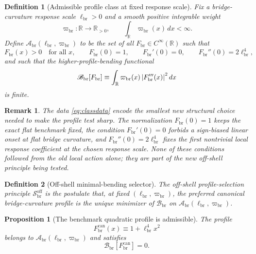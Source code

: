 \documentclass[11pt]{article}
\newcommand{\CurvScale}{\ell_{\mathrm{br}}}
\newcommand{\CurvProfile}{F_{\mathrm{br}}}
\newcommand{\CurvProfileCan}{F_{\mathrm{br}}^{\mathrm{can}}}
\newcommand{\ProfWeight}{\varpi_{\mathrm{br}}}
\newcommand{\ProfClass}{\mathscr A_{\mathrm{br}}}
\newcommand{\ProfBend}{\mathscr B_{\mathrm{br}}}
\newcommand{\ProfRule}{\mathscr S_{\mathrm{br}}^{\mathrm{off}}}
\newtheorem{definition}{Definition}
\newtheorem{proposition}{Proposition}
\newtheorem{remark}{Remark}
\begin{document}
\begin{definition}[Admissible profile class at fixed response scale]
\label{def:class}
Fix a bridge-curvature response scale \(\CurvScale>0\) and a smooth positive integrable weight
\begin{equation}
\ProfWeight:\mathbb R\to\mathbb R_{>0},
\qquad
\int_{\mathbb R}\ProfWeight(x)\,dx<\infty.
\label{eq:weight}
\end{equation}
Define \(\ProfClass(\CurvScale,\ProfWeight)\) to be the set of all \(\CurvProfile\in C^\infty(\mathbb R)\) such that
\begin{equation}
\CurvProfile(x)>0\quad\text{for all }x,
\qquad
\CurvProfile(0)=1,
\qquad
\CurvProfile'(0)=0,
\qquad
\CurvProfile''(0)=2\CurvScale^4,
\label{eq:classdata}
\end{equation}
and such that the higher-profile-bending functional
\begin{equation}
\ProfBend[\CurvProfile]
\equiv
\int_{\mathbb R}\ProfWeight(x)\,\abs{\CurvProfile'''(x)}^2\,dx
\label{eq:bending}
\end{equation}
is finite.
\end{definition}

\begin{remark}
The data \eqref{eq:classdata} encode the smallest new structural choice needed to make the profile test sharp. The normalization \(\CurvProfile(0)=1\) keeps the exact flat benchmark fixed, the condition \(\CurvProfile'(0)=0\) forbids a sign-biased linear onset at flat bridge curvature, and \(\CurvProfile''(0)=2\CurvScale^4\) fixes the first nontrivial local response coefficient at the chosen response scale. None of these conditions followed from the old local action alone; they are part of the new off-shell principle being tested.
\end{remark}

\begin{definition}[Off-shell minimal-bending selector]
\label{def:selector}
The \emph{off-shell profile-selection principle} \(\ProfRule\) is the postulate that, at fixed \((\CurvScale,\ProfWeight)\), the preferred canonical bridge-curvature profile is the unique minimizer of \(\ProfBend\) on \(\ProfClass(\CurvScale,\ProfWeight)\).
\end{definition}

\begin{proposition}[The benchmark quadratic profile is admissible]
\label{prop:benchmark}
The profile
\begin{equation}
\CurvProfileCan(x)\equiv 1+\CurvScale^4x^2
\label{eq:canonicalprofile}
\end{equation}
belongs to \(\ProfClass(\CurvScale,\ProfWeight)\) and satisfies
\begin{equation}
\ProfBend[\CurvProfileCan]=0.
\label{eq:zerobend}
\end{equation}
\end{proposition}
\end{document}
